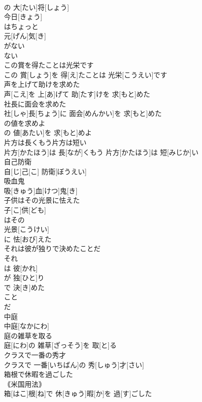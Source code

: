 \documentclass[8pt]{extreport}
\begin{document}
\begin{CJK}{UTF8}{min}
\\	の 大[たい]将[しょう]
\\	今日[きょう]
\\	はちょっと 
\\	元[げん]気[き]
\\	がない 
\\	ない 
\\	この賞を得たことは光栄です	
\\	この 賞[しょう]を 得[え]たことは 光栄[こうえい]です
\\	声を上げて助けを求めた	
\\	声[こえ]を 上[あ]げて 助[たす]けを 求[もと]めた
\\	社長に面会を求めた	
\\	社[しゃ]長[ちょう]に 面会[めんかい]を 求[もと]めた
\\	の値を求めよ	
\\	[かい]の 値[あたい]を 求[もと]めよ
\\	片方は長くもう片方は短い	
\\	片方[かたほう]は 長[なが]くもう 片方[かたほう]は 短[みじか]い
\\	自己防衛	
\\	自[じ]己[こ] 防衛[ぼうえい]
\\	吸血鬼	
\\	吸[きゅう]血[けつ]鬼[き]
\\	子供はその光景に怯えた	
\\	子[こ]供[ども]
\\	はその 
\\	光景[こうけい]
\\	に 怯[おび]えた 
\\	それは彼が独りで決めたことだ	
\\	それ 
\\	は 彼[かれ]
\\	が 独[ひと]り 
\\	で 決[き]めた 
\\	こと 
\\	だ
\\	中庭	
\\	中庭[なかにわ]
\\	庭の雑草を取る	
\\	庭[にわ]の 雑草[ざっそう]を 取[と]る
\\	クラスで一番の秀才	
\\	クラスで 一番[いちばん]の 秀[しゅう]才[さい]
\\	箱根で休暇を過ごした	
\\	｟米国用法｠
\\	箱[はこ]根[ね]で 休[きゅう]暇[か]を 過[す]ごした

\end{CJK}
\end{document}
